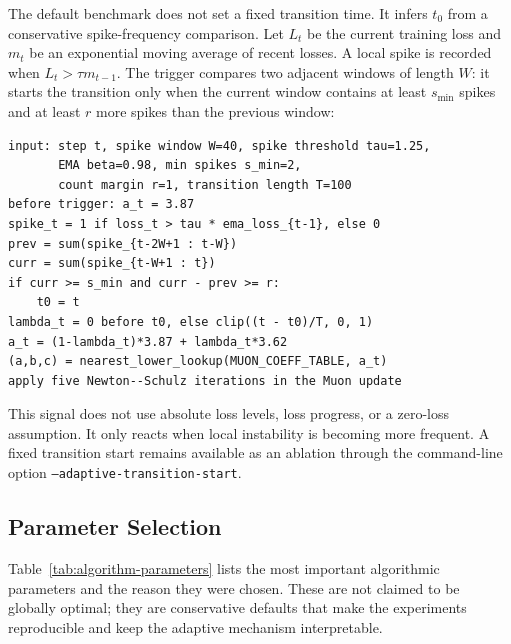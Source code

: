 \documentclass[11pt]{article}
\begin{document}
The default benchmark does not set a fixed transition time. It infers $t_0$
from a conservative spike-frequency comparison. Let $L_t$ be the current
training loss and $m_t$ be an exponential moving average of recent losses. A
local spike is recorded when $L_t > \tau m_{t-1}$. The trigger compares two
adjacent windows of length $W$: it starts the transition only when the current
window contains at least $s_{\min}$ spikes and at least $r$ more spikes than
the previous window:
\begin{verbatim}
input: step t, spike window W=40, spike threshold tau=1.25,
       EMA beta=0.98, min spikes s_min=2,
       count margin r=1, transition length T=100
before trigger: a_t = 3.87
spike_t = 1 if loss_t > tau * ema_loss_{t-1}, else 0
prev = sum(spike_{t-2W+1 : t-W})
curr = sum(spike_{t-W+1 : t})
if curr >= s_min and curr - prev >= r:
    t0 = t
lambda_t = 0 before t0, else clip((t - t0)/T, 0, 1)
a_t = (1-lambda_t)*3.87 + lambda_t*3.62
(a,b,c) = nearest_lower_lookup(MUON_COEFF_TABLE, a_t)
apply five Newton--Schulz iterations in the Muon update
\end{verbatim}
This signal does not use absolute loss levels, loss progress, or a zero-loss
assumption. It only reacts when local instability is becoming more frequent. A
fixed transition start remains available as an ablation through the command-line
option \texttt{--adaptive-transition-start}.

\subsection{Parameter Selection}

Table~\ref{tab:algorithm-parameters} lists the most important algorithmic
parameters and the reason they were chosen. These are not claimed to be globally
optimal; they are conservative defaults that make the experiments reproducible
and keep the adaptive mechanism interpretable.
\end{document}
